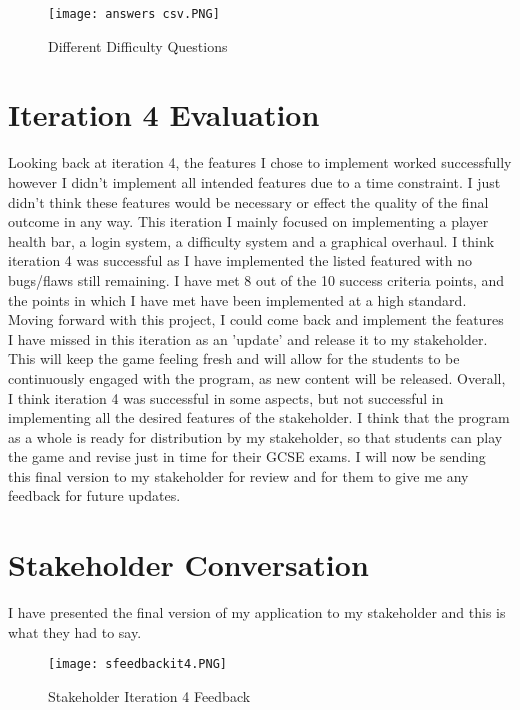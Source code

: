 \documentclass[12pt]{report}
\begin{document}
\begin{figure}[H]
    \centering
    \texttt{[image: answers csv.PNG]}
    \caption{Different Difficulty Questions}
\end{figure}


\pagebreak

\section{Iteration 4 Evaluation}
Looking back at iteration 4, the features I chose to implement worked successfully however I didn't implement all intended features due to a time constraint. I just didn't think these features would be necessary or effect the quality of the final outcome in any way. This iteration I mainly focused on implementing a player health bar, a login system, a difficulty system and a graphical overhaul. I think iteration 4 was successful as I have implemented the listed featured with no bugs/flaws still remaining. I have met 8 out of the 10 success criteria points, and the points in which I have met have been implemented at a high standard. 
\newline
\newline
Moving forward with this project, I could come back and implement the features I have missed in this iteration as an 'update' and release it to my stakeholder. This will keep the game feeling fresh and will allow for the students to be continuously engaged with the program, as new content will be released.
\newline
\newline
Overall, I think iteration 4 was successful in some aspects, but not successful in implementing all the desired features of the stakeholder. I think that the program as a whole is ready for distribution by my stakeholder, so that students can play the game and revise just in time for their GCSE exams. I will now be sending this final version to my stakeholder for review and for them to give me any feedback for future updates.

\section{Stakeholder Conversation}
I have presented the final version of my application to my stakeholder and this is what they had to say.

\begin{figure}[H]
    \centering
    \texttt{[image: sfeedbackit4.PNG]}
    \caption{Stakeholder Iteration 4 Feedback}
\end{figure}
\end{document}
